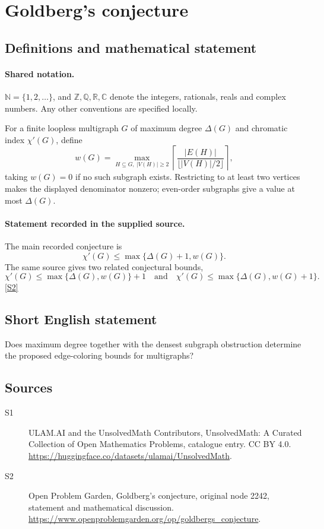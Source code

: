 \documentclass[11pt]{article}
\newcommand{\sref}[2]{\hyperlink{source:#1:#2}{[S#2]}}
\begin{document}
\section{Goldberg's conjecture}\label{statement}

\subsection{Definitions and mathematical statement}

\paragraph{Shared notation.}$\mathbb N=\{1,2,\ldots\}$, and $\mathbb Z,\mathbb Q,\mathbb R,\mathbb C$ denote the integers, rationals, reals and complex numbers. Any other conventions are specified locally.


For a finite loopless multigraph $G$ of maximum degree $\Delta(G)$ and chromatic index $\chi'(G)$, define \[w(G)=\max_{H\subseteq G,\ |V(H)|\ge2}\left\lceil\frac{|E(H)|}{\lfloor |V(H)|/2\rfloor}\right\rceil,\] taking $w(G)=0$ if no such subgraph exists. Restricting to at least two vertices makes the displayed denominator nonzero; even-order subgraphs give a value at most $\Delta(G)$.
\paragraph{Statement recorded in the supplied source.}
The main recorded conjecture is \[\chi'(G)\le\max\{\Delta(G)+1,w(G)\}.\] The same source gives two related conjectural bounds, \[\chi'(G)\le\max\{\Delta(G),w(G)\}+1\quad\text{and}\quad\chi'(G)\le\max\{\Delta(G),w(G)+1\}.\] \sref{statement}{2}
\subsection{Short English statement}
Does maximum degree together with the densest subgraph obstruction determine the proposed edge-coloring bounds for multigraphs?
\subsection{Sources}
\begin{description}
\item[\hypertarget{source:statement:1}{S1}] ULAM.AI and the UnsolvedMath Contributors, UnsolvedMath: A Curated Collection of Open Mathematics Problems, catalogue entry. CC BY 4.0. \url{https://huggingface.co/datasets/ulamai/UnsolvedMath}.
\item[\hypertarget{source:statement:2}{S2}] Open Problem Garden, Goldberg's conjecture, original node 2242, statement and mathematical discussion. \url{https://www.openproblemgarden.org/op/goldbergs_conjecture}.
\end{description}
\label{end:statement}
\end{document}

